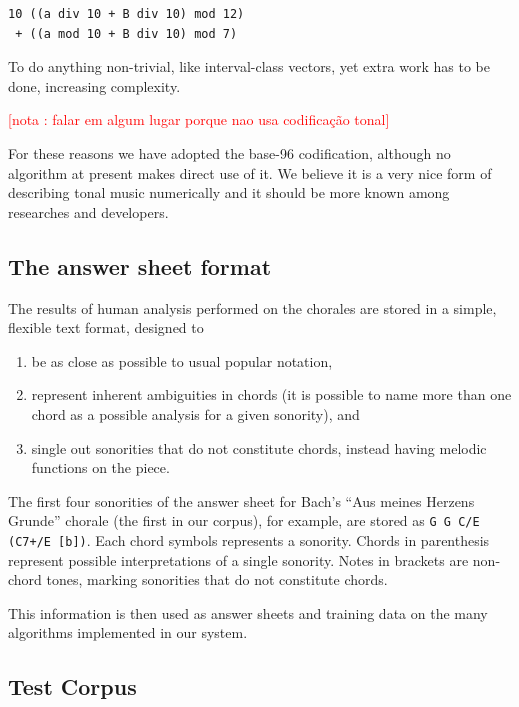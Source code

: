 \documentclass{article}
\newcounter{notacounter}
\newcommand{\nota}[1]{
  \addtocounter{notacounter}{1}
  \textcolor{red}{[nota \arabic{notacounter}: #1]}
}
\begin{document}
\begin{verbatim}
10 ((a div 10 + B div 10) mod 12)
 + ((a mod 10 + B div 10) mod 7)
\end{verbatim}

To do anything non-trivial, like interval-class vectors, yet extra
work has to be done, increasing complexity.

\nota{falar em algum lugar porque nao usa codificação tonal}

For these reasons we have adopted the base-96 codification, although
no algorithm at present makes direct use of it. We believe it is a
very nice form of describing tonal music numerically and it should be
more known among researches and developers.

\subsection{The answer sheet format}
\label{sec:formato-dos-acordes}

The results of human analysis performed on the chorales are stored in
a simple, flexible text format, designed to

\begin{enumerate}
\item be as close as possible to usual popular notation,
\item represent inherent ambiguities in chords (it is possible to name
  more than one chord as a possible analysis for a given sonority),
  and
\item single out sonorities that do not constitute chords, instead
  having melodic functions on the piece.
\end{enumerate}

The first four sonorities of the answer sheet for Bach's ``Aus meines
Herzens Grunde'' chorale (the first in our corpus), for example, are
stored as \texttt{G G C/E (C7+/E [b])}. Each chord symbols represents
a sonority. Chords in parenthesis represent possible interpretations
of a single sonority. Notes in brackets are non-chord tones, marking
sonorities that do not constitute chords.

This information is then used as answer sheets and training data on the
many algorithms implemented in our system.

\subsection{Test Corpus}
\label{sec:test-corpus}
\end{document}

